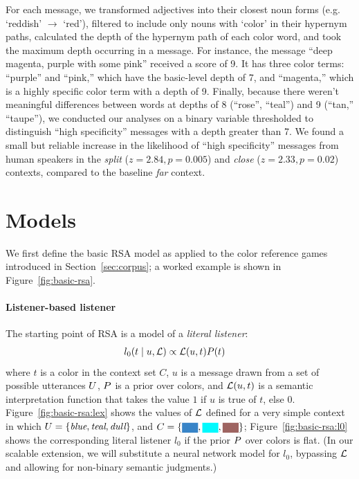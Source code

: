 \documentclass[11pt,letterpaper]{article}
\newcommand{\term}{\textit}
\newcommand{\word}{\textit}
\newcommand{\utt}{u}
\newcommand{\context}{C}
\newcommand{\target}{t}
\renewcommand{\|}{\mid}
\newcommand{\set}[1]{\left\{#1\right\}}
\newcommand{\secref}[1]{Section~\ref{#1}}
\newcommand{\Figref}[1]{Figure~\ref{#1}}
\newcommand{\figref}[1]{Figure~\ref{#1}}
\newcommand{\colorPatch}[2][xxxx]{
  \colorbox[HTML]{#2}{{\color[HTML]{#2}#1}}}
\newcommand{\colorContextNarrow}[3]{
  \colorPatch[xx]{#1}, \colorPatch[xx]{#2}, \colorPatch[xx]{#3}}
\newcommand{\cond}{\emph}
\begin{document}
For each message, we transformed adjectives into their closest noun forms (e.g. `reddish' $\rightarrow$ `red'), filtered to include only nouns with `color' in their hypernym paths, calculated the depth of the hypernym path of each color word, and took the maximum depth occurring in a message. For instance, the message ``deep magenta, purple with some pink'' received a score of 9. It has three color terms: ``purple'' and ``pink,'' which have the basic-level depth of 7, and ``magenta,'' which is a highly specific color term with a depth of 9. Finally, because there weren't meaningful differences between words at depths of 8 (``rose'', ``teal'') and 9 (``tan,'' ``taupe''), we conducted our analyses on a binary variable thresholded to distinguish ``high specificity'' messages with a depth greater than 7.
We found a small but reliable increase in the likelihood of ``high specificity'' messages from human speakers in the \cond{split}  ($z = 2.84, p = 0.005$) and \cond{close}  ($z = 2.33, p = 0.02$) contexts, compared to the baseline \cond{far} context.

\section{Models}

We first define the basic RSA model as applied to the
color reference games introduced in \secref{sec:corpus}; a worked example
is shown in \figref{fig:basic-rsa}.

\paragraph{Listener-based listener}
The starting point of RSA is a model of a \term{literal listener}:
\begin{align}
  l_{0}(\target \| \utt, \Lex)
  &\propto
  \Lex(\utt, \target) \targetPrior(\target)
\end{align}
where $\target$ is a color in the context
set $\context$, $\utt$ is a message drawn from a set of possible
utterances $U$, $P$ is a prior over colors,
and $\Lex(\utt, \target)$ is a semantic interpretation function that
takes the value $1$ if $\utt$ is true of $\target$, else $0$.
\Figref{fig:basic-rsa:lex} shows the values of $\mathcal{L}$ defined for
a very simple context in which $\Messages=\set{\word{blue},
  \word{teal}, \word{dull}}$, and $\context =
\set{\colorContextNarrow{3884C7}{02F9FD}{9E6461}{}}$;
\figref{fig:basic-rsa:l0} shows the corresponding literal listener
$l_0$ if the prior $P$ over colors is flat.
(In our scalable extension, we will substitute a neural network model for $l_0$,
bypassing $\mathcal{L}$ and allowing for non-binary semantic judgments.)
\end{document}
